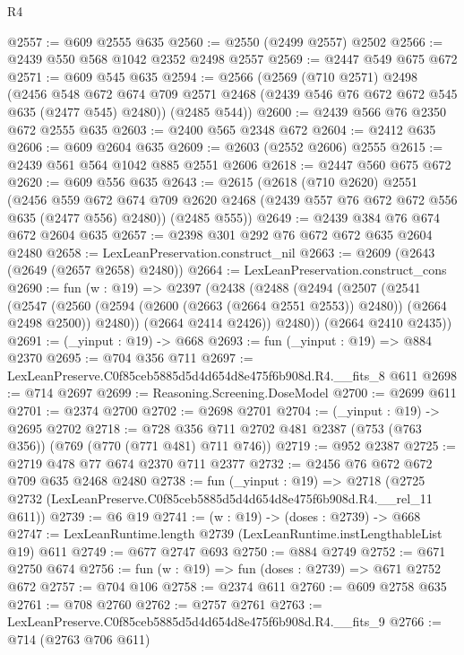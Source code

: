\begin{lexlean}{R4}
\begin{coremodule}
@2557 := @609 @2555 @635
@2560 := @2550 (@2499 @2557) @2502
@2566 := @2439 @550 @568 @1042 @2352 @2498 @2557
@2569 := @2447 @549 @675 @672
@2571 := @609 @545 @635
@2594 := @2566
    (@2569
      (@710 @2571)
      @2498
      (@2456
        @548
        @672
        @674
        @709
        @2571
        @2468
        (@2439 @546 @76 @672 @672 @545 @635 (@2477 @545) @2480))
      (@2485 @544))
@2600 := @2439 @566 @76 @2350 @672 @2555 @635
@2603 := @2400 @565 @2348 @672
@2604 := @2412 @635
@2606 := @609 @2604 @635
@2609 := @2603 (@2552 @2606) @2555
@2615 := @2439 @561 @564 @1042 @885 @2551 @2606
@2618 := @2447 @560 @675 @672
@2620 := @609 @556 @635
@2643 := @2615
    (@2618
      (@710 @2620)
      @2551
      (@2456
        @559
        @672
        @674
        @709
        @2620
        @2468
        (@2439 @557 @76 @672 @672 @556 @635 (@2477 @556) @2480))
      (@2485 @555))
@2649 := @2439 @384 @76 @674 @672 @2604 @635
@2657 := @2398 @301 @292 @76 @672 @672 @635 @2604 @2480
@2658 := LexLeanPreservation.construct_nil
@2663 := @2609 (@2643 (@2649 (@2657 @2658) @2480))
@2664 := LexLeanPreservation.construct_cons
@2690 := fun (w : @19) =>
  @2397
    (@2438
      (@2488
        (@2494
          (@2507
            (@2541
              (@2547
                (@2560 (@2594 (@2600 (@2663 (@2664 @2551 @2553)) @2480)) (@2664 @2498 @2500))
                @2480))
            (@2664 @2414 @2426))
          @2480))
      (@2664 @2410 @2435))
@2691 := (_yinput : @19) -> @668
@2693 := fun (_yinput : @19) => @884 @2370
@2695 := @704 @356 @711
@2697 := LexLeanPreserve.C0f85ceb5885d5d4d654d8e475f6b908d.R4.__fits_8 @611
@2698 := @714 @2697
@2699 := Reasoning.Screening.DoseModel
@2700 := @2699 @611
@2701 := @2374 @2700
@2702 := @2698 @2701
@2704 := (_yinput : @19) -> @2695 @2702
@2718 := @728 @356 @711 @2702 @481 @2387 (@753 (@763 @356)) (@769 (@770 (@771 @481) @711 @746))
@2719 := @952 @2387
@2725 := @2719 @478 @77 @674 @2370 @711 @2377
@2732 := @2456 @76 @672 @672 @709 @635 @2468 @2480
@2738 := fun (_yinput : @19) =>
  @2718 (@2725 @2732 (LexLeanPreserve.C0f85ceb5885d5d4d654d8e475f6b908d.R4.__rel_11 @611))
@2739 := @6 @19
@2741 := (w : @19) -> (doses : @2739) -> @668
@2747 := LexLeanRuntime.length @2739 (LexLeanRuntime.instLengthableList @19) @611
@2749 := @677 @2747 @693
@2750 := @884 @2749
@2752 := @671 @2750 @674
@2756 := fun (w : @19) => fun (doses : @2739) => @671 @2752 @672
@2757 := @704 @106
@2758 := @2374 @611
@2760 := @609 @2758 @635
@2761 := @708 @2760
@2762 := @2757 @2761
@2763 := LexLeanPreserve.C0f85ceb5885d5d4d654d8e475f6b908d.R4.__fits_9
@2766 := @714 (@2763 @706 @611)

\end{coremodule}
\end{lexlean}
